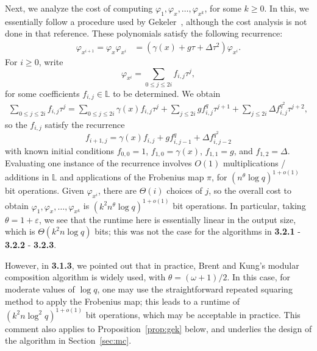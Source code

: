 \documentclass[sigconf]{acmart}
\renewcommand{\L}{\mathbb{L}}
\begin{document}
\smallskip{}
Next, we analyze the cost of computing 
$\varphi_1,\varphi_x,\dots,\varphi_{x^k}$, for some $k \ge 0$. In
this, we essentially follow a procedure used by
Gekeler~\cite[Sec.~3]{frobdist}, although the cost analysis is not
done in that reference. These polynomials satisfy the following
recurrence:
\begin{align*}
 \varphi_{x^{i+1}} = \varphi_x \varphi_{x^i} & = (\gamma(x) + g\tau + \Delta \tau^2) \varphi_{x^i}.
\end{align*}
For $i \ge 0$, write 
\[\varphi_{x^i}  = \sum_{0 \le j \leq 2i} f_{i,j} \tau^{j},\]
for some coefficients $f_{i,j} \in \L$ to be determined. We obtain
\begin{align*}
 \sum_{0 \le j \leq 2i} f_{i,j} \tau^{j} = \sum_{0 \le j \leq 2i} \gamma(x) f_{i,j} \tau^{j} + \sum_{j \leq 2i} g f_{i,j}^q \tau^{j+1} + \sum_{j \leq 2i} \Delta f_{i,j}^{q^2} \tau^{j+2},
\end{align*}
so the $f_{i,j}$ satisfy the recurrence
\[ f_{i+1,j} = \gamma(x) f_{i,j} + g f_{i,j-1}^q + \Delta f_{i,j-2}^{q^2}\]
with known initial conditions $f_{0,0} = 1$, $f_{1,0} = \gamma(x)$,
$f_{1,1} = g$, and $f_{1,2} = \Delta$. Evaluating one instance of the
recurrence involves $O(1)$ multiplications / additions in $\L$ and
applications of the Frobenius map $\pi$, for $(n^\theta \log
q)^{1+o(1)}$ bit operations.  Given $\varphi_{x^i}$, there are
$\Theta(i)$ choices of $j$, so the overall cost to obtain
$\varphi_1,\varphi_x,\dots,\varphi_{x^k}$ is $(k^2 n^\theta \log
q)^{1+o(1)}$ bit operations.
In particular, taking $\theta = 1+\varepsilon$, we see that the
runtime here is essentially linear in the output size, which is
$\Theta(k^2 n \log q)$ bits; this was not the case for the algorithms 
in {\bf 3.2.1} - {\bf 3.2.2} - {\bf 3.2.3}.

However, in {\bf 3.1.3}, we pointed out that in practice, Brent and Kung's
modular composition algorithm is widely used, with
$\theta=(\omega+1)/2$. In this case, for moderate values of $\log q$,
one may use the straightforward repeated squaring method to apply the
Frobenius map; this leads to a runtime of $(k^2 n \log^2 q)^{1+o(1)}$
bit operations, which may be acceptable in practice. This comment also
applies to Proposition~\ref{prop:gek} below, and underlies the design
of the algorithm in Section~\ref{sec:mc}.
\end{document}
